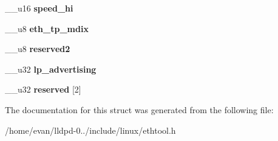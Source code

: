 \begin{DoxyCompactItemize}
\item 
\-\_\-\-\_\-u16 {\bfseries speed\-\_\-hi}\label{structethtool__cmd_a12bc04ddefae17133646d3d242c86bb0}

\item 
\-\_\-\-\_\-u8 {\bfseries eth\-\_\-tp\-\_\-mdix}\label{structethtool__cmd_a1aaf64c87db88d82f79397df51d268ae}

\item 
\-\_\-\-\_\-u8 {\bfseries reserved2}\label{structethtool__cmd_a63cdbe87a6fdc53ac9eef07234a8f102}

\item 
\-\_\-\-\_\-u32 {\bfseries lp\-\_\-advertising}\label{structethtool__cmd_a559d771d3f7ee73d3c2105f65c17bbb1}

\item 
\-\_\-\-\_\-u32 {\bfseries reserved} [2]\label{structethtool__cmd_a8c6bf34164baa7a5d6553b1834ddea52}

\end{DoxyCompactItemize}


\-The documentation for this struct was generated from the following file\-:\begin{DoxyCompactItemize}
\item 
/home/evan/lldpd-\/0../include/linux/ethtool.\-h\end{DoxyCompactItemize}
